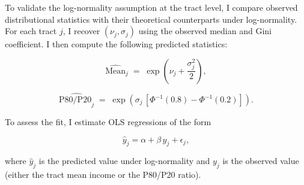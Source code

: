 To validate the log-normality assumption at the tract level, I compare observed distributional statistics with their theoretical counterparts under log-normality. For each tract $j$, I recover $(\nu_j,\sigma_j)$ using the observed median and Gini coefficient. I then compute the following predicted statistics:

\begin{equation}
\widehat{\text{Mean}}_j \;=\; \exp\!\left(\nu_j + \frac{\sigma_j^2}{2}\right),
\end{equation}

\begin{equation}
\widehat{\text{P80/P20}_j} \;=\; \exp\!\left(\sigma_j \,[\Phi^{-1}(0.8) - \Phi^{-1}(0.2)]\right).
\end{equation}

To assess the fit, I estimate OLS regressions of the form

\begin{equation}
\hat{y}_j = \alpha + \beta\, y_j + \epsilon_j,
\end{equation}

where $\hat{y}_j$ is the predicted value under log-normality and $y_j$ is the observed value (either the tract mean income or the P80/P20 ratio).
